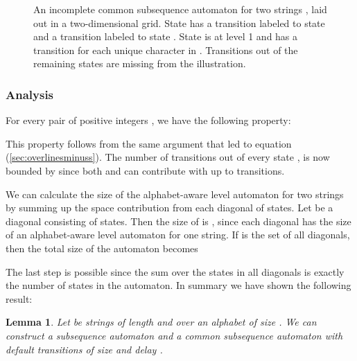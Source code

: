 \documentclass[a4paper,11pt]{article}
\newtheorem{lemma}{Lemma}
\begin{document}
\begin{figure}
\caption{\label{fig:simple2d} An incomplete common subsequence automaton for two strings , laid out in a two-dimensional grid. State  has a transition labeled  to state  and a transition labeled  to state . State  is at level 1 and has a transition for each unique character in . Transitions out of the remaining states are missing from the illustration.}
\end{figure}

\subsubsection{Analysis}

For every pair of positive integers , we have the following property:

This property follows from the same argument that led to equation (\ref{sec:overlinesminuss}). The number of transitions out of every state , is now bounded by  since both  and  can contribute with up to  transitions.

We can calculate the size of the alphabet-aware level automaton for two strings by summing up the space contribution from each diagonal of states. Let  be a diagonal consisting of  states. Then the size of  is , since each diagonal has the size of an alphabet-aware level automaton for one string. If  is the set of all diagonals, then the total size of the automaton becomes

The last step is possible since the sum over the states in all diagonals is exactly the number of states in the automaton. In summary we have shown the following result:

\begin{lemma}
Let  be strings of length  and  over an alphabet of size . We can construct a subsequence automaton and a common subsequence automaton with default transitions of size  and delay .
\end{lemma}
\end{document}
